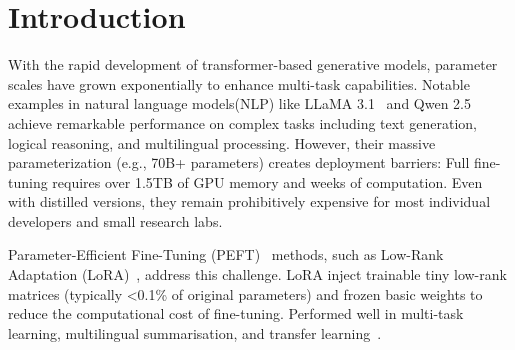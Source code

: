 
\section{Introduction}
With the rapid development of transformer-based generative models, parameter scales have grown exponentially to enhance multi-task capabilities. Notable examples in natural language models(NLP) like LLaMA 3.1~\citep {dubey2024llama} and Qwen 2.5~\citep {qwen2.5} achieve remarkable performance on complex tasks including text generation, logical reasoning, and multilingual processing.  However, their massive parameterization (e.g., 70B+ parameters) creates deployment barriers: Full fine-tuning requires over 1.5TB of GPU memory and weeks of computation. Even with distilled versions, they remain prohibitively expensive for most individual developers and small research labs.

Parameter-Efficient Fine-Tuning (PEFT)~\citep {xu2023parameter} methods, such as Low-Rank Adaptation (LoRA)~\citep {whitehouse-etal-2024-low}, address this challenge. LoRA inject trainable tiny low-rank matrices (typically <0.1\% of original parameters) and frozen basic weights to reduce the computational cost of fine-tuning. Performed well in multi-task learning, multilingual summarisation, and transfer learning~\citep{whitehouse-etal-2024-low,zhao2024adamergex}. 

